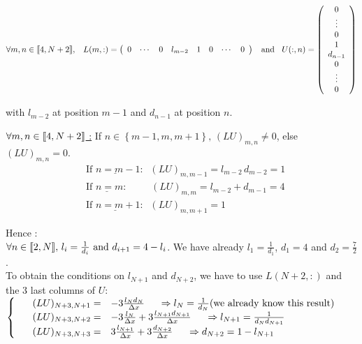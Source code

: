 \documentclass[10pt]{article}
\begin{document}
$$\forall m,n\in\mbox{\textlbrackdbl} 4,N+2\mbox{\textrbrackdbl},\;\;\; L(m,:) = \left(\begin{array}{cccccccc}
0 & \cdots & 0 & l_{m-2} & 1 & 0 & \cdots & 0
\end{array}\right) \;\; \mbox{ and } \;\; U(:,n) = \left(\begin{array}{c}
0 \\ \vdots \\ 0 \\ 1 \\ d_{n-1} \\ 0 \\ \vdots \\ 0
\end{array}\right) $$
\begin{center}
with $l_{m-2}$ at position $m-1$ and $d_{n-1}$ at position $n$.
\end{center} 


\underline{$\forall m,n\in\mbox{\textlbrackdbl} 4,N+2\mbox{\textrbrackdbl}$ :} \;\;\;\;
If $n\in\left\lbrace m-1,m,m+1\right\rbrace,\, (LU)_{m,n}\neq 0$, else $(LU)_{m,n} = 0$. 
\begin{align*}
  &\underline{\mbox{If } n = m-1 :}\;\; (LU)_{m,m-1} = l_{m-2}\,d_{m-2} = 1 \\
  &\underline{\mbox{If } n = m :} \;\;\;\;\;\;\;\;\,(LU)_{m,m} = l_{m-2} + d_{m-1} = 4 \\
  &\underline{\mbox{If } n = m+1 :}\;\;(LU)_{m,m+1} = 1 
\end{align*}

Hence : \\
$\forall n\in\mbox{\textlbrackdbl} 2,N\mbox{\textrbrackdbl},\, l_i = \frac{1}{d_i} \mbox{ and } d_{i+1} = 4-l_i$.
We have already $l_1 = \frac{1}{d_1}$, $d_1=4$ and $d_2 = \frac{7}{2}$. \\

 To obtain the conditions on $l_{N+1}$ and $d_{N+2}$, we have to use $L(N+2,:)$ and the 3 last columns of $U$:\\

   $\left \{
 \begin{array}{r c l}
   \;&(LU)_{N+3,N+1}=& -3 \frac{l_N d_N}{\Delta x} \hspace{5 mm} \Rightarrow l_N=\frac{1}{d_N} \mbox{(we already know this result)} \\
   \;&(LU)_{N+3,N+2}=& -3 \frac{l_{N}}{\Delta x} + 3 \frac{l_{N+1} d_{N+1}}{\Delta x} \hspace{5 mm}  \Rightarrow l_{N+1} = \frac{1}{d_N d_{N+1}} \\
   \;&(LU)_{N+3,N+3}=&3\frac{l_{N+1}}{\Delta x} + 3\frac{d_{N+2}}{\Delta x} \hspace{5 mm} \Rightarrow d_{N+2}= 1 - l_{N+1}\\
 \end{array}
   \right. $\\
\\
\end{document}
